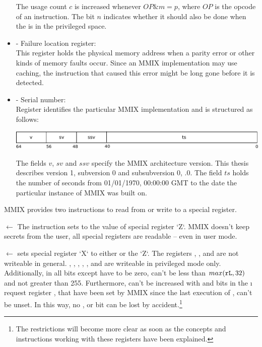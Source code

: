 \begin{itemize}
	The usage count $c$ is increased whenever $OP \& m = p$, where $OP$ is the opcode of an instruction. The bit $n$ indicates whether it should also be done when the  is in the privileged space. \citep[pg. 32]{mmix-doc}
	\item {} - Failure location register:\\
	This register holds the physical memory address when a parity error or other kinds of memory faults occur. Since an MMIX implementation may use caching, the instruction that caused this error might be long gone before it is detected. \citep[pg. 40]{mmix-doc}
	\item {} - Serial number:\\
	Register  identifies the particular MMIX implementation and is structured as follows:
	
	\includegraphics[width=\linewidth]{img/rN-crop.pdf}
	
	The fields $v$, $sv$ and $ssv$ specify the MMIX architecture version. This thesis describes version 1, subversion 0 and subsubversion 0, .0. The field $ts$ holds the number of seconds from 01/01/1970, 00:00:00 GMT to the date the particular instance of MMIX was built on. \citep[pg. 32]{mmix-doc}
\end{itemize}

\noindent MMIX provides two instructions to read from or write to a special register.

\instrtbl
	{}
	{ $\leftarrow$ }
\noindent The instruction  sets  to the value of special register `Z`. MMIX doesn't keep secrets from the user, \ie all special registers are readable -- even in user mode. \citep[pg. 34]{mmix-doc}

\instrtbl
	{}
	{ $\leftarrow$ }
\noindent {} sets special register `X` to either  or the  `Z`. The registers , ,  and  are not writeable in general. , , , , ,  and  are writeable in privileged mode only. Additionally, in  all bits except  have to be zero,  can't be less than $max({\tt rL},32)$ and not greater than 255. Furthermore,  can't be increased with  and bits in the \i{ request register} , that have been set by MMIX since the last execution of , can't be unset. In this way, no ,  or  bit can be lost by accident.\footnote{The restrictions will become more clear as soon as the concepts and instructions working with these registers have been explained.} \citep[pg. 34]{mmix-doc}

